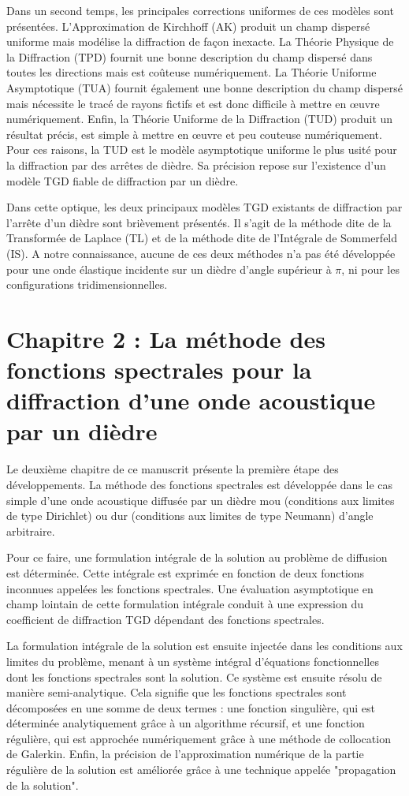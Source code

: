 Dans un second temps, les principales corrections uniformes de ces modèles sont présentées. L'Approximation de Kirchhoff (AK) produit un champ dispersé uniforme mais modélise la diffraction de façon inexacte. La Théorie Physique de la Diffraction (TPD) fournit une bonne description du champ dispersé dans toutes les directions mais est coûteuse numériquement. La Théorie Uniforme Asymptotique (TUA) fournit également une bonne description du champ dispersé mais nécessite le tracé de rayons fictifs et est donc difficile à mettre en œuvre numériquement. Enfin, la Théorie Uniforme de la Diffraction (TUD) produit un résultat précis, est simple à mettre en œuvre et peu couteuse numériquement. Pour ces raisons, la TUD est le modèle asymptotique uniforme le plus usité pour la diffraction par des arrêtes de dièdre. Sa précision repose sur l'existence d'un modèle TGD fiable de diffraction par un dièdre. 

Dans cette optique, les deux principaux modèles TGD existants de diffraction par l'arrête d'un dièdre sont brièvement présentés. Il s'agit de la méthode dite de la Transformée de Laplace (TL) et de la méthode dite de l'Intégrale de Sommerfeld (IS). A notre connaissance, aucune de ces deux méthodes n'a pas été développée pour une onde élastique incidente sur un dièdre d'angle supérieur à $\pi$, ni pour les configurations tridimensionnelles.

\section[Résumé du chapitre 2]{Chapitre 2 : La méthode des fonctions spectrales pour la diffraction d'une onde acoustique par un dièdre}

Le deuxième chapitre de ce manuscrit présente la première étape des développements. La méthode des fonctions spectrales est développée dans le cas simple d'une onde acoustique diffusée par un dièdre mou (conditions aux limites de type Dirichlet) ou dur (conditions aux limites de type Neumann) d'angle arbitraire. 

Pour ce faire, une formulation intégrale de la solution au problème de diffusion est déterminée. Cette intégrale est exprimée en fonction de deux fonctions inconnues appelées les fonctions spectrales. Une évaluation asymptotique en champ lointain de cette formulation intégrale conduit à une expression du coefficient de diffraction TGD dépendant des fonctions spectrales.

La formulation intégrale de la solution est ensuite injectée dans les conditions aux limites du problème, menant à un système intégral d'équations fonctionnelles dont les fonctions spectrales sont la solution. Ce système est ensuite résolu de manière semi-analytique. Cela signifie que les fonctions spectrales sont décomposées en une somme de deux termes : une fonction singulière, qui est déterminée analytiquement grâce à un algorithme récursif, et une fonction régulière, qui est approchée numériquement grâce à une méthode de collocation de Galerkin. Enfin, la précision de l'approximation numérique de la partie régulière de la solution est améliorée grâce à une technique appelée "propagation de la solution".

